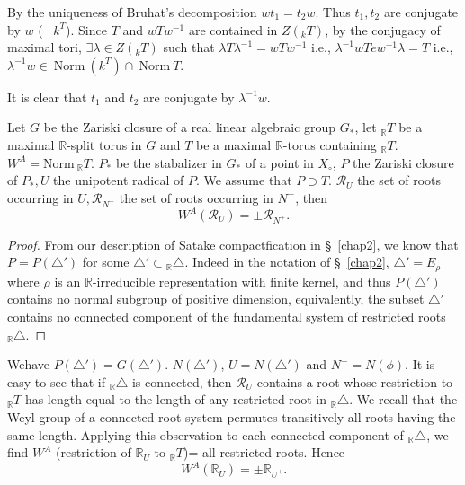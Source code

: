 By the uniqueness of Bruhat's decomposition $wt_1 = t_2w$. Thus $t_1,
t_2$ are conjugate by $w$ (~ $k^T$). Since $T$ and $w
Tw^{-1}$ are contained in $Z({}_k T)$, by the conjugacy of maximal tori,
$\exists \lambda \in Z({}_k T)$ such that $\lambda T \lambda^{-1}= w T
w^{-1}$ i.e., $\lambda^{-1} w T ew^{-1} \lambda =T$ i.e.,
$\lambda^{-1} w \in ~\text{Norm}~ (k^T) \cap ~\text{Norm}~T$. 

It is clear that $t_1$ and $t_2$ are conjugate by $\lambda^{-1} w$. 

\begin{lemma} \label{chap8:lem8.3}
  Let $G$ be the Zariski closure of a real linear algebraic group
  $G_*$, let ${}_\mathbb{R}T$ be a maximal $\mathbb{R}$-split torus in
  $G$ and $T$ be a maximal $\mathbb{R}$-torus containing
  ${}_\mathbb{R}T$. $W^A= \text{Norm}~ {}_\mathbb{R}T$. $P_*$ be the
  stabalizer in $G_*$ of a point in $X_\circ$, $P$ the Zariski
  closure of $P_*, U$ the unipotent radical of $P$. We assume that $P
  \supset T$. $\mathscr{R}_U$ the set of roots occurring in $U,
  \mathscr{R}_{N^+}$ the set of roots occurring in $N^+$, then
  $$
  W^A (\mathscr{R}_U)= \pm \mathscr{R}_{N^+}.
  $$
\end{lemma}

\begin{proof}
  From our description of Satake compactfication in \S\ \ref{chap2}, we know
  that $P = P (\triangle')$ for some $\triangle' \subset
  {}_\mathbb{R}\triangle$. Indeed in the notation of \S\ \ref{chap2}, $\triangle'
  = E_\rho$ where $\rho$ is an $\mathbb{R}$-irreducible representation
  with finite kernel, and thus $P(\triangle')$ contains no normal
  subgroup of positive dimension, equivalently, the subset
  $\triangle'$ contains no connected component of the fundamental
  system of restricted roots ${}_\mathbb{R}\triangle$.
\end{proof}

We\pageoriginale have $P (\triangle')= G (\triangle')$. $N(\triangle')$, $U =
N(\triangle')$ and $N^+= N (\phi)$. It is easy to see that if
${}_\mathbb{R} \triangle$ is connected, then $\mathscr{R}_U$ contains a
root whose restriction to ${}_\mathbb{R}T$ has length equal to the
length of any restricted root in ${}_\mathbb{R}\triangle$. We recall
that the Weyl group of a connected root system permutes transitively
all roots having the same length. Applying this observation to each
connected component of ${}_\mathbb{R} \triangle$, we find $W^A$
(restriction of $\mathbb{R}_U$ to ${}_\mathbb{R}T$)= all restricted
roots. Hence
$$
W^A (\mathbb{R}_U) = \pm \mathbb{R}_{U^+}.
$$

